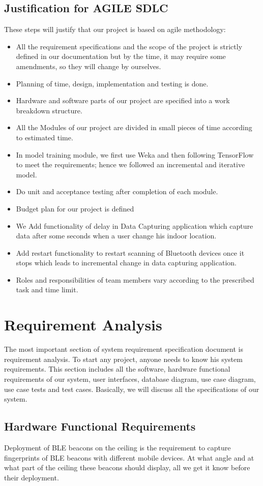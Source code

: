 \documentclass{article}
\begin{document}
\subsection{Justification for AGILE SDLC}

These steps will justify that our project is based on agile methodology:
\begin{itemize}
\item All the requirement specifications and the scope of the project is strictly defined in our documentation but by the time, it may require some amendments, so they will change by ourselves.
\item Planning of time, design, implementation and testing is done.
\item Hardware and software parts of our project are specified into a work breakdown structure.
\item All the Modules of our project are divided in small pieces of time according to estimated time.
\item In model training module, we first use Weka and then following TensorFlow to meet the requirements; hence we followed an incremental and iterative model.
\item Do unit and acceptance testing after completion of each module.
\item Budget plan for our project is defined
\item We Add functionality of delay in Data Capturing application  which capture data after some seconds when a user change his indoor location.
\item Add restart functionality to restart scanning of Bluetooth devices once it stops which leads to incremental change in data capturing application.
\item Roles and responsibilities of team members vary according to the prescribed task and time limit.
\end{itemize}

\section{Requirement Analysis}
The most important section of system requirement specification document is requirement analysis. To start any project, anyone needs to know his system requirements. This section includes all the software, hardware functional requirements of our system, user interfaces, database diagram, use case diagram, use case tests and test cases. Basically, we will discuss all the specifications of our system.
\subsection{Hardware Functional Requirements}
Deployment of BLE beacons on the ceiling is the requirement to capture fingerprints of BLE beacons with different mobile devices. At what angle and at what part of the ceiling these beacons should display, all we get it know before their deployment.
\end{document}

